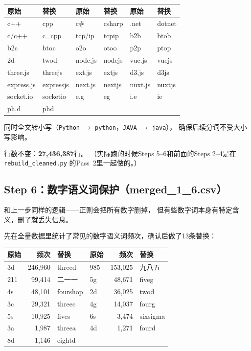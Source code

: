 \documentclass[12pt,a4paper]{ctexart}
\begin{document}
\begin{table}[h]
\centering
\small
\begin{tabular}{ll|ll|ll}
\toprule
\textbf{原始} & \textbf{替换} & \textbf{原始} & \textbf{替换} & \textbf{原始} & \textbf{替换} \\
\midrule
c++ & cpp & c\# & csharp & .net & dotnet \\
c/c++ & c\_cpp & tcp/ip & tcpip & b2b & btob \\
b2c & btoc & o2o & otoo & p2p & ptop \\
2d & twod & node.js & nodejs & vue.js & vuejs \\
three.js & threejs & ext.js & extjs & d3.js & d3js \\
express.js & expressjs & next.js & nextjs & nuxt.js & nuxtjs \\
socket.io & socketio & e.g & eg & i.e & ie \\
ph.d & phd & & & & \\
\bottomrule
\end{tabular}
\end{table}

同时全文转小写（\texttt{Python} $\to$ \texttt{python}，\texttt{JAVA} $\to$ \texttt{java}），
确保后续分词不受大小写影响。

行数不变：\textbf{27,436,387}行。
（实际跑的时候Steps 5--6和前面的Steps 2--4是在 \texttt{rebuild\_cleaned.py} 的Pass~2里一起做的。）


\subsection{Step 6：数字语义词保护（merged\_1\_6.csv）}

和上一步同样的逻辑——正则会把所有数字删掉，
但有些数字词本身有特定含义，删了就丢失信息。

先在全量数据里统计了常见的数字语义词频次，确认后做了13条替换：

\begin{table}[h]
\centering
\small
\begin{tabular}{lrl|lrl}
\toprule
\textbf{原始} & \textbf{频次} & \textbf{替换} & \textbf{原始} & \textbf{频次} & \textbf{替换} \\
\midrule
3d & 246,960 & threed & 985 & 153,025 & 九八五 \\
211 & 99,414 & 二一一 & 5g & 48,671 & fiveg \\
4s & 48,101 & fourshop & 2d & 36,025 & twod \\
3c & 29,321 & threec & 4g & 14,037 & fourg \\
5s & 10,925 & fives & 6s & 3,474 & sixsigma \\
3a & 1,987 & threea & 4d & 1,271 & fourd \\
8d & 1,146 & eightd & & & \\
\bottomrule
\end{tabular}
\end{table}
\end{document}
